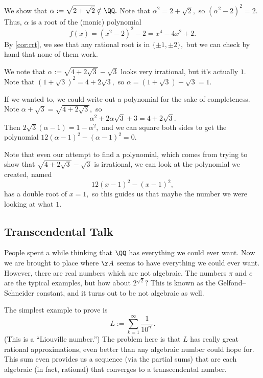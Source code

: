 \begin{ex}
	We show that $\alpha:=\sqrt{2+\sqrt2}\notin\QQ.$ Note that $\alpha^2=2+\sqrt2,$ so $\left(\alpha^2-2\right)^2=2.$ Thus, $\alpha$ is a root of the (monic) polynomial
	\[f(x)=\left(x^2-2\right)^2-2=x^4-4x^2+2.\]
	By \autoref{cor:rrt}, we see that any rational root is in $\{\pm1,\pm2\},$ but we can check by hand that none of them work.
\end{ex}
\begin{ex}
	We note that $\alpha:=\sqrt{4+2\sqrt3}-\sqrt3$ looks very irrational, but it's actually $1.$ Note that $\left(1+\sqrt3\right)^2=4+2\sqrt3,$ so $\alpha=(1+\sqrt3)-\sqrt3=1.$
	
	If we wanted to, we could write out a polynomial for the sake of completeness. Note $\alpha+\sqrt3=\sqrt{4+2\sqrt3},$ so
	\[\alpha^2+2\alpha\sqrt3+3=4+2\sqrt3.\]
	Then $2\sqrt3(\alpha-1)=1-\alpha^2,$ and we can square both sides to get the polynomial $12(\alpha-1)^2-\left(\alpha-1\right)^2=0.$
\end{ex}
Note that even our attempt to find a polynomial, which comes from trying to show that $\sqrt{4+2\sqrt3}-\sqrt3$ is irrational, we can look at the polynomial we created, named
\[12(x-1)^2-\left(x-1\right)^2,\]
has a double root of $x=1,$ so this guides us that maybe the number we were looking at what $1.$

\subsection{Transcendental Talk}
People spent a while thinking that $\QQ$ has everything we could ever want. Now we are brought to place where $\AA$ seems to have everything we could ever want. However, there are real numbers which are not algebraic. The numbers $\pi$ and $e$ are the typical examples, but how about $2^{\sqrt2}$? This is known as the Gelfond--Schneider constant, and it turns out to be not algebraic as well.

The simplest example to prove is
\[L:=\sum_{k=1}^\infty\frac1{10^{n!}}.\]
(This is a ``Liouville number.'') The problem here is that $L$ has really great rational approximations, even better than any algebraic number could hope for. This sum even provides us a sequence (via the partial sums) that are each algebraic (in fact, rational) that converges to a transcendental number.

